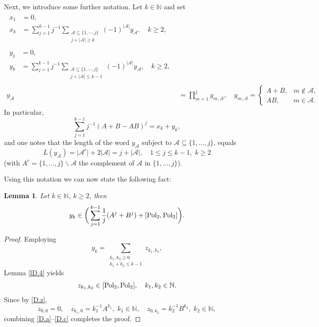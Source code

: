 \documentclass[reqno,10pt,centertags]{amsart}
\newcommand{\bbN}{{\mathbb{N}}}
\newcommand{\cA}{{\mathcal A}}
\newcommand{\lb}{\label}
\let\geq\geqslant
\let\leq\leqslant
\numberwithin{equation}{section}
\newtheorem{lemma}[theorem]{Lemma}
\theoremstyle{remark}
\begin{document}
Next, we introduce some further notation. Let $k \in \bbN$ and set
\begin{align} 
\begin{split} 
x_1 &= 0, \\
x_k &=\sum_{j=1}^{k-1} j^{-1} 
\sum_{\substack{\cA \subseteq \{1,\cdots,j\}\\ j+|\cA|\geq k}} 
(-1)^{|\cA|}y_{\cA}, \quad k \geq 2,   \lb{D.33} 
\end{split} \\
\begin{split} 
y_1 &= 0, \\
y_k&=\sum_{j=1}^{k-1} j^{-1} \sum_{\substack{\cA \subseteq \{1,\cdots,j\}\\ j+|\cA|\leq k-1}} 
(-1)^{|\cA|}y_{\cA},   \quad k \geq 2, 
\end{split} \\
y_{\cA}&=\prod_{m=1}^jy_{m,\cA},\quad y_{m,\cA}=
\begin{cases}
A+B,& m \notin \cA, \\
AB,& m \in \cA. 
\end{cases}
\end{align} 
In particular, 
\begin{equation} 
\sum_{j=1}^{k-1} j^{-1} (A+B-AB)^j = x_k + y_k,    \lb{D.binom} 
\end{equation} 
and one notes that the length of the word $y_{\cA}$ subject to $\cA \subseteq \{1,\dots,j\}$, equals 
\begin{equation}
L(y_{\cA}) = \big|\cA^c\big| + 2 |\cA| = j +|\cA|, \quad 1 \leq j \leq k-1, \; k \geq 2    \lb{D.number} 
\end{equation}
(with $A^c = \{1,\dots,j\} \backslash \cA$ the complement of $\cA$ in $\{1,\dots,j\}$). 

Using this notation we can now state the following fact:

\begin{lemma} \lb{lD.5} Let $k \in \bbN$, $k\geq 2$, then 
\begin{equation} 
y_k\in \bigg(\sum_{j=1}^{k-1}\frac1j(A^j+B^j)+[{\rm Pol_2},{\rm Pol_2}]\bigg).
\end{equation} 
\end{lemma}
\begin{proof} Employing 
\begin{equation} 
y_k=\sum_{\substack{k_1,k_2\geq0\\ k_1+k_2 \leq k-1}}z_{k_1,k_2},    \lb{D.a}
\end{equation} 
Lemma \ref{lD.4} yields 
\begin{equation} 
z_{k_1,k_2}\in [{\rm Pol_2},{\rm Pol_2}],\quad k_1,k_2 \in \bbN.   \lb{D.b}
\end{equation} 
Since by \eqref{D.z}, 
\begin{equation} 
z_{0,0}=0, \quad 
z_{k_1,0}= k_1^{-1} A^{k_1},\; k_1\in \bbN,\quad z_{0,k_2}= k_2^{-1} B^{k_2},\; k_2 \in \bbN,    \lb{D.c}
\end{equation} 
combining \eqref{D.a}--\eqref{D.c} completes the proof.
\end{proof}
\end{document}
